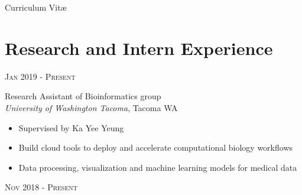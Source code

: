 \documentclass[10pt]{article} %
\begin{document}
\color{text1} %


\par{%
{\color{headings} Curriculum {Vit\ae}\\[15pt]\par} %


\begin{minipage}[t]{0.5\textwidth} %
\vspace{0pt} %


\section{Research and Intern Experience}

{\raggedleft\textsc{Jan 2019 - Present}\par}

{\raggedright\large Research Assistant of Bioinformatics group\\
\textit{University of Washington Tacoma}, Tacoma WA\\[5pt]}

\normalsize{\begin{itemize}
		\item Supervised by Ka Yee Yeung
		\item Build cloud tools to deploy and accelerate computational biology workflows
		\item Data processing, visualization and machine learning models for medical data
\end{itemize}}

{\raggedleft\textsc{Nov 2018 - Present}\par}


\end{minipage}}
\end{document}
